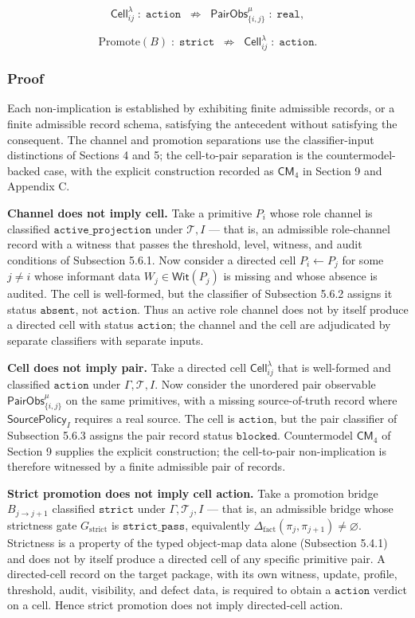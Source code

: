 \documentclass[11pt]{article}
\theoremstyle{definition}
\begin{document}
\[
\mathsf{Cell}_{ij}^{\lambda}\;:\;\texttt{action}\;\;\not\Rightarrow\;\;\mathsf{PairObs}_{\{i,j\}}^{\mu}\;:\;\texttt{real},
\]

\[
\mathrm{Promote}(B)\;:\;\texttt{strict}\;\;\not\Rightarrow\;\;\mathsf{Cell}_{ij}^{\lambda}\;:\;\texttt{action}.
\]

\subsubsection{Proof}

Each non-implication is established by exhibiting finite admissible records, or a finite admissible record schema, satisfying the antecedent without satisfying the consequent. The channel and promotion separations use the classifier-input distinctions of Sections 4 and 5; the cell-to-pair separation is the countermodel-backed case, with the explicit construction recorded as \(\mathsf{CM}_4\) in Section 9 and Appendix C.

\textbf{Channel does not imply cell.} Take a primitive \(P_i\) whose role channel is classified \(\texttt{active\_projection}\) under \(\mathcal T,I\) --- that is, an admissible role-channel record with a witness that passes the threshold, level, witness, and audit conditions of Subsection 5.6.1. Now consider a directed cell \(P_i\leftarrow P_j\) for some \(j\neq i\) whose informant data \(W_j\in\mathsf{Wit}(P_j)\) is missing and whose absence is audited. The cell is well-formed, but the classifier of Subsection 5.6.2 assigns it status \(\texttt{absent}\), not \(\texttt{action}\). Thus an active role channel does not by itself produce a directed cell with status \(\texttt{action}\); the channel and the cell are adjudicated by separate classifiers with separate inputs.

\textbf{Cell does not imply pair.} Take a directed cell \(\mathsf{Cell}_{ij}^{\lambda}\) that is well-formed and classified \(\texttt{action}\) under \(\Gamma,\mathcal T,I\). Now consider the unordered pair observable \(\mathsf{PairObs}_{\{i,j\}}^{\mu}\) on the same primitives, with a missing source-of-truth record where \(\mathsf{SourcePolicy}_I\) requires a real source. The cell is \(\texttt{action}\), but the pair classifier of Subsection 5.6.3 assigns the pair record status \(\texttt{blocked}\). Countermodel \(\mathsf{CM}_4\) of Section 9 supplies the explicit construction; the cell-to-pair non-implication is therefore witnessed by a finite admissible pair of records.

\textbf{Strict promotion does not imply cell action.} Take a promotion bridge \(B_{j\to j+1}\) classified \(\texttt{strict}\) under \(\Gamma,\mathcal T_j,I\) --- that is, an admissible bridge whose strictness gate \(G_{\mathrm{strict}}\) is \(\texttt{strict\_pass}\), equivalently \(\Delta_{\mathrm{fact}}(\pi_j,\pi_{j+1})\neq\varnothing\). Strictness is a property of the typed object-map data alone (Subsection 5.4.1) and does not by itself produce a directed cell of any specific primitive pair. A directed-cell record on the target package, with its own witness, update, profile, threshold, audit, visibility, and defect data, is required to obtain a \(\texttt{action}\) verdict on a cell. Hence strict promotion does not imply directed-cell action.
\end{document}
